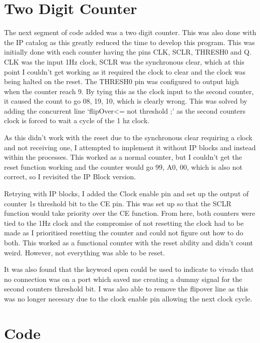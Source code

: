 \documentclass[a4paper, 12pt]{article}
\begin{document}
	\section{Two Digit Counter}
		The next segment of code added was a two digit counter. This was also done with the IP catalog as this greatly reduced the time to develop this program. This was initially done with each counter having the pins CLK, SCLR, THRESH0 and Q. CLK was the input 1Hz clock, SCLR was the synchronous clear, which at this point I couldn't get working as it required the clock to clear and the clock was being halted on the reset. The THRESH0 pin was configured to output high when the counter reach 9. By tying this as the clock input to the second counter, it caused the count to go 08, 19, 10, which is clearly wrong. This was solved by adding the concurrent line `flipOver<= not  threshold ;' as the second counters clock is forced to wait a cycle of the 1 hz clock.
		\par
		As this didn't work with the reset due to the synchronous clear requiring a clock and not receiving one, I attempted to implement it without IP blocks and instead within the processes. This worked as a normal counter, but I couldn't get the reset function working and the counter would go 99, A0, 00, which is also not correct, so I revisited the IP Block version.
		\par
		Retrying with IP blocks, I added the Clock enable pin and set up the output of counter 1s threshold bit to the CE pin. This was set up so that the SCLR function would take priority over the CE function. From here, both counters were tied to the 1Hz clock and the compromise of not resetting the clock had to be made as I prioritised resetting the counter and could not figure out how to do both. This worked as a functional counter with the reset ability and didn't count weird. However, not everything was able to be reset. 
		\par
		It was also found that the keyword open could be used to indicate to vivado that no connection was on a port which saved me creating a dummy signal for the second counters threshold bit. I was also able to remove the flipover line as this was no longer necesary due to the clock enable pin allowing the next clock cycle.

	\section{Code}
		



\end{document}
